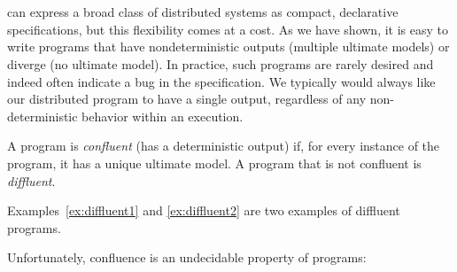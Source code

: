 \section{\slang}
\label{sec:confluence}

\lang can express a broad class of distributed systems as compact, declarative specifications, but this flexibility comes at a cost.
As we have shown, it is easy to write programs that have nondeterministic outputs (multiple ultimate models) or diverge (no ultimate model).  In practice, such programs are rarely 
desired and indeed often indicate a bug in the specification.
We typically would always like our distributed program to have a single output, regardless of any non-deterministic behavior within an execution.

\begin{definition}
A \lang program is {\em confluent} (has a deterministic output) if, for every instance of the program, it has a unique ultimate model.  A program that is not confluent is {\em diffluent}.
\end{definition}

Examples~\ref{ex:diffluent1} and \ref{ex:diffluent2} are two examples of diffluent programs.

Unfortunately, confluence is an undecidable property of \lang programs:

